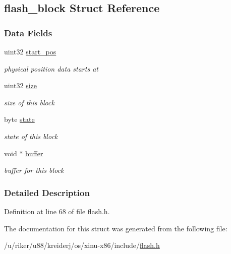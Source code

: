 \hypertarget{structflash__block}{}\subsection{flash\+\_\+block Struct Reference}
\label{structflash__block}
\subsubsection*{Data Fields}
\begin{DoxyCompactItemize}
\item 
\mbox{\label{structflash__block_a109bdf90bddaa5b1be8889daec94ba3c}} 
uint32 \hyperlink{structflash__block_a109bdf90bddaa5b1be8889daec94ba3c}{start\+\_\+pos}
\begin{DoxyCompactList}\small\item\em physical position data starts at \end{DoxyCompactList}\item 
\mbox{\label{structflash__block_a0242a6d867603af82318b84b01130a37}} 
uint32 \hyperlink{structflash__block_a0242a6d867603af82318b84b01130a37}{size}
\begin{DoxyCompactList}\small\item\em size of this block \end{DoxyCompactList}\item 
\mbox{\label{structflash__block_a5df4552d519f39d7fb57acc85e2cf2c7}} 
byte \hyperlink{structflash__block_a5df4552d519f39d7fb57acc85e2cf2c7}{state}
\begin{DoxyCompactList}\small\item\em state of this block \end{DoxyCompactList}\item 
\mbox{\label{structflash__block_a5cf861854cbd1bb416d88104457f9fd4}} 
void $\ast$ \hyperlink{structflash__block_a5cf861854cbd1bb416d88104457f9fd4}{buffer}
\begin{DoxyCompactList}\small\item\em buffer for this block \end{DoxyCompactList}\end{DoxyCompactItemize}


\subsubsection{Detailed Description}


Definition at line 68 of file flash.\+h.



The documentation for this struct was generated from the following file\+:\begin{DoxyCompactItemize}
\item 
/u/riker/u88/kreiderj/os/xinu-\/x86/include/\hyperlink{flash_8h}{flash.\+h}\end{DoxyCompactItemize}
